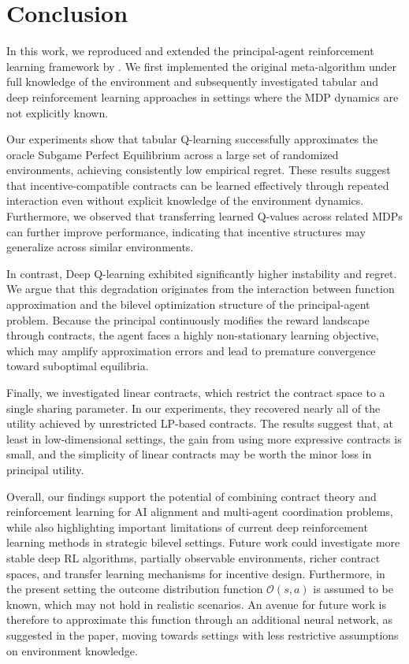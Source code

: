 \documentclass{article}
\theoremstyle{plain}
\theoremstyle{definition}
\theoremstyle{remark}
\begin{document}
\section*{Conclusion}
In this work, we reproduced and extended the principal-agent reinforcement learning framework by \citet{ivanov2024principal}. We first implemented the original meta-algorithm under full knowledge of the environment and subsequently investigated tabular and deep reinforcement learning approaches in settings where the MDP dynamics are not explicitly known.

Our experiments show that tabular Q-learning successfully approximates the oracle Subgame Perfect Equilibrium across a large set of randomized environments, achieving consistently low empirical regret. These results suggest that incentive-compatible contracts can be learned effectively through repeated interaction even without explicit knowledge of the environment dynamics. Furthermore, we observed that transferring learned Q-values across related MDPs can further improve performance, indicating that incentive structures may generalize across similar environments.

In contrast, Deep Q-learning exhibited significantly higher instability and regret. We argue that this degradation originates from the interaction between function approximation and the bilevel optimization structure of the principal-agent problem. Because the principal continuously modifies the reward landscape through contracts, the agent faces a highly non-stationary learning objective, which may amplify approximation errors and lead to premature convergence toward suboptimal equilibria.

Finally, we investigated linear contracts, which restrict the contract space to a single sharing parameter. In our experiments, they recovered nearly all of the utility achieved by unrestricted LP-based contracts. The results suggest that, at least in low-dimensional settings, the gain from using more expressive contracts is small, and the simplicity of linear contracts may be worth the minor loss in principal utility.

Overall, our findings support the potential of combining contract theory and reinforcement learning for AI alignment and multi-agent coordination problems, while also highlighting important limitations of current deep reinforcement learning methods in strategic bilevel settings. Future work could investigate more stable deep RL algorithms, partially observable environments, richer contract spaces, and transfer learning mechanisms for incentive design.
Furthermore, in the present setting the outcome distribution function $\mathcal{O}(s,a)$ is assumed to be known, which may not hold in realistic scenarios. An avenue for future work is therefore to approximate this function through an additional neural network, as suggested in the paper, moving towards settings with less restrictive assumptions on environment knowledge.
\end{document}
